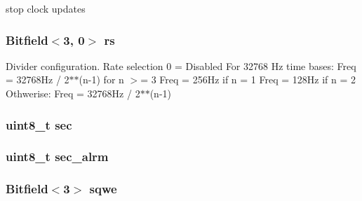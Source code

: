 stop clock updates \hypertarget{classMC146818_af889c7c5198ff826946778bb663d2da5}{
\subsubsection[{rs}]{\setlength{\rightskip}{0pt plus 5cm}Bitfield$<$3, 0$>$ {\bf rs}}}
\label{classMC146818_af889c7c5198ff826946778bb663d2da5}


Divider configuration. Rate selection 0 = Disabled For 32768 Hz time bases: Freq = 32768Hz / 2$\ast$$\ast$(n-\/1) for n $>$= 3 Freq = 256Hz if n = 1 Freq = 128Hz if n = 2 Othwerise: Freq = 32768Hz / 2$\ast$$\ast$(n-\/1) \hypertarget{classMC146818_ad1696900026b287a87c563b733a21bc3}{
\subsubsection[{sec}]{\setlength{\rightskip}{0pt plus 5cm}uint8\_\-t {\bf sec}}}
\label{classMC146818_ad1696900026b287a87c563b733a21bc3}
\hypertarget{classMC146818_a1d76d44501cb4a6ae50d2e4be0e81932}{
\subsubsection[{sec\_\-alrm}]{\setlength{\rightskip}{0pt plus 5cm}uint8\_\-t {\bf sec\_\-alrm}}}
\label{classMC146818_a1d76d44501cb4a6ae50d2e4be0e81932}
\hypertarget{classMC146818_a91777eb5d8187720f48d7d5a193c7295}{
\subsubsection[{sqwe}]{\setlength{\rightskip}{0pt plus 5cm}Bitfield$<$3$>$ {\bf sqwe}}}
\label{classMC146818_a91777eb5d8187720f48d7d5a193c7295}


